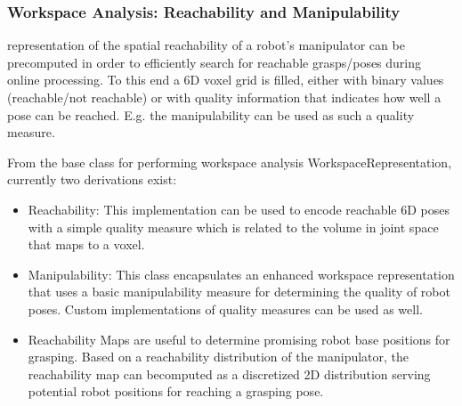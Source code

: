\subsubsection*{Workspace Analysis: Reachability and Manipulability}
 representation of the spatial reachability of a robot's manipulator can be precomputed in order to efficiently search for reachable grasps/poses during online processing. To this end a 6D voxel grid is filled, either with binary values (reachable/not reachable) or with quality information that indicates how well a pose can be reached. E.g. the manipulability can be used as such a quality measure.
\par
From the base class for performing workspace analysis WorkspaceRepresentation, currently two derivations exist: 
\begin{itemize}
\item Reachability: This implementation can be used to encode reachable 6D poses with a simple quality measure which is related to the volume in joint space that maps to a voxel. 
\item Manipulability: This class encapsulates an enhanced workspace representation that uses a basic manipulability measure for determining the quality of robot poses. Custom implementations of quality measures can be used as well.  
\item Reachability Maps are useful to determine promising robot base positions for grasping. Based on a reachability distribution of the manipulator, the reachability map can becomputed as a discretized 2D distribution serving potential robot positions for reaching a grasping pose. 

\end{itemize}
